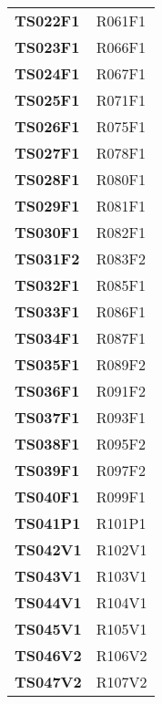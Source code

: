 \documentclass[../../piano-di-qualifica.tex]{subfiles}
\begin{document}
\begin{longtable}[H]{>{\centering\bfseries}m{5cm} >{\centering\arraybackslash}m{5cm}}
  TS022F1            & R061F1                            \\
  TS023F1            & R066F1                            \\
  TS024F1            & R067F1                            \\
  TS025F1            & R071F1                            \\
  TS026F1            & R075F1                            \\
  TS027F1            & R078F1                            \\
  TS028F1            & R080F1                            \\
  TS029F1            & R081F1                            \\
  TS030F1            & R082F1                            \\
  TS031F2            & R083F2                            \\
  TS032F1            & R085F1                            \\
  TS033F1            & R086F1                            \\
  TS034F1            & R087F1                            \\
  TS035F1            & R089F2                            \\
  TS036F1            & R091F2                            \\
  TS037F1            & R093F1                            \\
  TS038F1            & R095F2                            \\
  TS039F1            & R097F2                            \\
  TS040F1            & R099F1                            \\
  TS041P1            & R101P1                            \\
  TS042V1            & R102V1                            \\
  TS043V1            & R103V1                            \\
  TS044V1            & R104V1                            \\
  TS045V1            & R105V1                            \\
  TS046V2            & R106V2                            \\
  TS047V2            & R107V2                            \\

\end{longtable}
\end{document}
